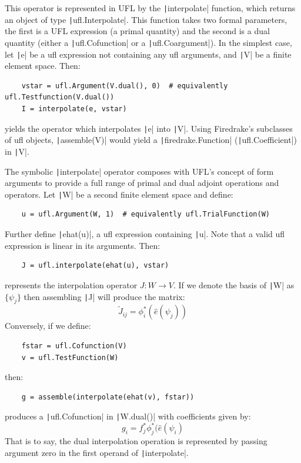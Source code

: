 \documentclass[a4paper,11pt]{article}
\begin{document}
This operator is represented in UFL by the \texttt|interpolate| function, which returns an object of type \texttt|ufl.Interpolate|. This function takes two formal parameters, the first is a UFL expression (a primal quantity) and the second is a dual quantity (either a \texttt|ufl.Cofunction| or a \texttt|ufl.Coargument|). In the simplest case, let \texttt|e| be a ufl expression not containing any ufl arguments, and \texttt|V| be a finite element space. Then:
\begin{verbatim}
    vstar = ufl.Argument(V.dual(), 0)  # equivalently ufl.Testfunction(V.dual())
    I = interpolate(e, vstar)
\end{verbatim}
yields the operator which interpolates \texttt|e| into \texttt|V|. Using Firedrake's subclasses of ufl objects, \texttt|assemble(V)| would yield a \texttt|firedrake.Function| (\texttt|ufl.Coefficient|) in \texttt|V|.

The symbolic \texttt|interpolate| operator composes with UFL's concept of form arguments to provide a full range of primal and dual adjoint operations and operators. Let \texttt|W| be a second finite element space and define:
\begin{verbatim}
    u = ufl.Argument(W, 1)  # equivalently ufl.TrialFunction(W)  
\end{verbatim}
Further define \texttt|ehat(u)|, a ufl expression containing \texttt|u|. Note that a valid ufl expression is linear in its arguments. Then:
\begin{verbatim}
    J = ufl.interpolate(ehat(u), vstar)
\end{verbatim}
represents the interpolation operator $J: W\rightarrow V$. If we denote the basis of \texttt|W| as $\{\psi_j\}$ then assembling \texttt|J| will produce the matrix:
\begin{equation}
    \tilde{J}_{ij} = \phi^*_i\left(\hat{e}(\psi_j)\right)
\end{equation}
Conversely, if we define:
\begin{verbatim}
    fstar = ufl.Cofunction(V)
    v = ufl.TestFunction(W)
\end{verbatim}
then:
\begin{verbatim}
    g = assemble(interpolate(ehat(v), fstar))
\end{verbatim}
produces a \texttt|ufl.Cofunction| in \texttt|W.dual()| with coefficients given by:
\begin{equation}
    g_i = f^*_j\phi^*_j(\hat{e}(\psi_i)
\end{equation}
That is to say, the dual interpolation operation is represented by passing argument zero in the first operand of \texttt|interpolate|.
\end{document}
